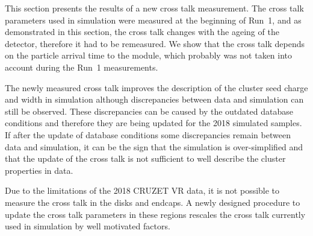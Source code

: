 This section presents the results of a new cross talk measurement. The cross talk parameters used in simulation were measured at the beginning of Run~1, and as demonstrated in this section, the cross talk changes with the ageing of the detector, therefore it had to be remeasured. We show that the cross talk depends on the particle arrival time to the module, which probably was not taken into account during the Run~1 measurements. 

The newly measured cross talk improves the description of the cluster seed charge and width in  simulation although discrepancies between data and simulation can still be observed. These discrepancies can be caused by the outdated database conditions and therefore they are being updated for the 2018 simulated samples. If after the update of database conditions some discrepancies remain between data and simulation, it can be the sign that the simulation is over-simplified and that the update of the cross talk is not sufficient to well describe the cluster properties in data.



Due to the limitations of the 2018 CRUZET VR data, it is not possible to measure the cross talk in the disks and endcaps. A newly designed procedure to update the cross talk parameters in these regions rescales the cross talk currently used in simulation  by well motivated factors. 

